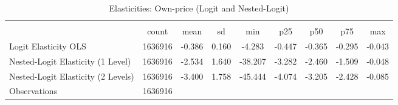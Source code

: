 \begin{table}[htbp]\centering
\def\sym#1{\ifmmode^{#1}\else\(^{#1}\)\fi}
\caption{Elasticities: Own-price (Logit and Nested-Logit)}
\begin{tabular}{l*{1}{cccccccc}}
\toprule
                    &\multicolumn{8}{c}{}                                                                                   \\
                    &       count&        mean&          sd&         min&         p25&         p50&         p75&         max\\
\midrule
Logit Elasticity OLS&     1636916&      -0.386&       0.160&      -4.283&      -0.447&      -0.365&      -0.295&      -0.043\\
Nested-Logit Elasticity (1 Level)&     1636916&      -2.534&       1.640&     -38.207&      -3.282&      -2.460&      -1.509&      -0.048\\
Nested-Logit Elasticity (2 Levels)&     1636916&      -3.400&       1.758&     -45.444&      -4.074&      -3.205&      -2.428&      -0.085\\
\midrule
Observations        &     1636916&            &            &            &            &            &            &            \\
\bottomrule
\end{tabular}
\end{table}
